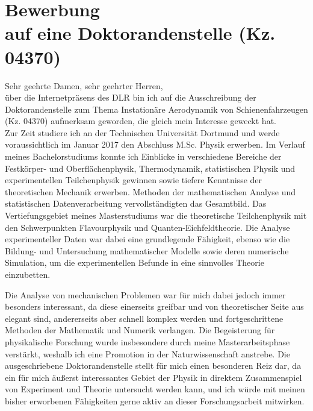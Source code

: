 \documentclass[12pt]{scrartcl}
\begin{document}
\pagestyle{empty}

\section*{Bewerbung \\
auf eine Doktorandenstelle 
(Kz. 04370)}

\vspace{0.7in}

Sehr geehrte Damen, sehr geehrter Herren,
\\

über die Internetpräsens des DLR bin ich auf die Ausschreibung der 
Doktorandenstelle zum Thema {\glqq Instationäre Aerodynamik von 
Schienenfahrzeugen\grqq} (Kz. 04370) aufmerksam geworden, die gleich mein 
Interesse geweckt hat.
\\

Zur Zeit studiere ich an der Technischen Universität Dortmund und werde 
voraussichtlich im Januar 2017 den Abschluss M.Sc. Physik erwerben. Im 
Verlauf meines Bachelorstudiums konnte ich Einblicke in verschiedene Bereiche 
der Festkörper- und Oberflächenphysik, Thermodynamik, statistischen Physik und 
experimentellen Teilchenphysik gewinnen sowie tiefere Kenntnisse der 
theoretischen Mechanik erwerben. Methoden der mathematischen Analyse und 
statistischen Datenverarbeitung vervollständigten das Gesamtbild. Das 
Vertiefungsgebiet 
meines Masterstudiums war die theoretische Teilchenphysik mit den 
Schwerpunkten Flavourphysik und Quanten-Eichfeldtheorie. Die 
Analyse experimenteller Daten war dabei eine grundlegende Fähigkeit, ebenso wie die 
Bildung- und Untersuchung mathematischer Modelle sowie deren numerische 
Simulation, um die experimentellen 
Befunde in eine sinnvolles Theorie einzubetten.

Die Analyse von mechanischen Problemen war für mich dabei jedoch immer 
besonders interessant, da diese einerseits greifbar und von theoretischer Seite 
aus elegant sind, andererseits aber schnell komplex werden und fortgeschrittene 
Methoden der Mathematik und Numerik verlangen.
Die Begeisterung für physikalische Forschung wurde insbesondere durch meine 
Masterarbeitsphase verstärkt, weshalb ich eine Promotion in der 
Naturwissenschaft anstrebe. 
Die ausgeschriebene Doktorandenstelle stellt für mich einen besonderen 
Reiz dar, da ein für mich äußerst interessantes Gebiet der Physik in direktem  
Zusammenspiel von Experiment und Theorie untersucht werden kann, und ich würde 
mit meinen bisher erworbenen Fähigkeiten gerne aktiv an dieser Forschungsarbeit 
mitwirken.
\\
\end{document}
